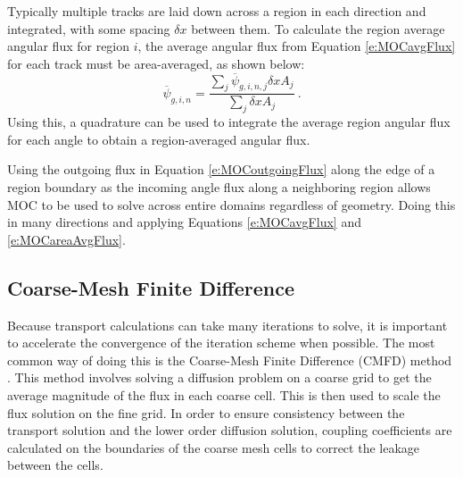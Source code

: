 Typically multiple tracks are laid down across a region in each direction and integrated, with some spacing $\delta x$ between them.  To calculate the region average angular flux for region $i$, the average angular flux from Equation \ref{e:MOCavgFlux} for each track must be area-averaged, as shown below:
\begin{equation}\label{e:MOCareaAvgFlux}
\overline{\psi}_{g,i,n} = \frac{\sum_j \overline{\psi}_{g,i,n,j} \delta x A_j}{\sum_j \delta x A_j}\ .
\end{equation}
Using this, a quadrature can be used to integrate the average region angular flux for each angle to obtain a region-averaged angular flux.

Using the outgoing flux in Equation \ref{e:MOCoutgoingFlux} along the edge of a region boundary as the incoming angle flux along a neighboring region allows MOC to be used to solve across entire domains regardless of geometry.  Doing this in many directions and applying Equations \ref{e:MOCavgFlux} and \ref{e:MOCareaAvgFlux}.

\subsection{Coarse-Mesh Finite Difference}\label{ss:CMFD}

Because transport calculations can take many iterations to solve, it is important to accelerate the convergence of the iteration scheme when possible.  The most common way of doing this is the Coarse-Mesh Finite Difference (CMFD) method \cite{SmithCMFDOrig}.  This method involves solving a diffusion problem on a coarse grid to get the average magnitude of the flux in each coarse cell.  This is then used to scale the flux solution on the fine grid.  In order to ensure consistency between the transport solution and the lower order diffusion solution, coupling coefficients are calculated on the boundaries of the coarse mesh cells to correct the leakage between the cells.

